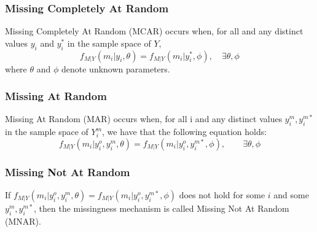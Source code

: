 \documentclass{beamer}
\begin{document}
\begin{frame}
\frametitle{Missing Completely At Random}
Missing Completely At Random (MCAR) occurs when, for all and any distinct values $y_{i}$ and $ y^{\ast}_{i}$ in the sample space of $Y$, $$f_{M|Y}(m_{i}|y_{i}, \theta) = f_{M|Y}(m_{i}|y^{\ast}_{i}, \phi), \quad \exists \theta, \phi$$ where $\theta$ and $\phi$ denote unknown parameters.
\end{frame}

\begin{frame}
\frametitle{Missing At Random}
Missing At Random (MAR) occurs when, for all i and any distinct values $y^{m}_{i}, y^{m\ast}_{i}$ in the sample space of $Y^{m}_{i}$, we have that the following equation holds: $$f_{M|Y}(m_{i}|y^{o}_{i}, y^{m}_{i}, \theta) = f_{M|Y}(m_{i}|y^{o}_{i}, y^{m\ast}_{i}, \phi), \qquad \exists \theta, \phi$$
\end{frame}

\begin{frame}
\frametitle{Missing Not At Random}
If $f_{M|Y}(m_{i}|y^{o}_{i}, y^{m}_{i}, \theta) = f_{M|Y}(m_{i}|y^{o}_{i}, y^{m\ast}_{i}, \phi)$ does not hold for some $i$ and some $y^{m}_{i}, y^{m\ast}_{i}$, then the missingness mechanism is called Missing Not At Random (MNAR).
\end{frame}
\end{document}
